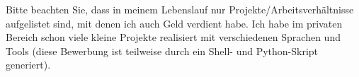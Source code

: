 		Bitte beachten Sie, dass in meinem Lebenslauf nur Projekte/Arbeitsverhältnisse aufgelistet sind, mit denen ich auch Geld verdient habe.
		Ich habe im privaten Bereich schon viele kleine Projekte realisiert mit verschiedenen Sprachen und Tools (diese Bewerbung ist teilweise durch ein Shell- und Python-Skript generiert).